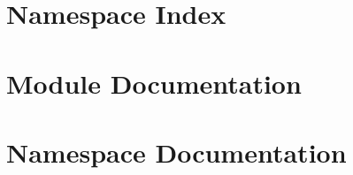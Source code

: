 \let\mypdfximage\pdfximage\def\pdfximage{\immediate\mypdfximage}\documentclass[twoside]{book}
\newcommand{\+}{\discretionary{\mbox{\scriptsize$\hookleftarrow$}}{}{}}
\newcommand{\clearemptydoublepage}{%
  \newpage{\pagestyle{empty}\cleardoublepage}%
}
\begin{document}
\chapter{Namespace Index}

\chapter{Module Documentation}













































\chapter{Namespace Documentation}



\newpage
{}



\backmatter
\newpage
{}
\clearemptydoublepage
{}
\printindex
\end{document}
